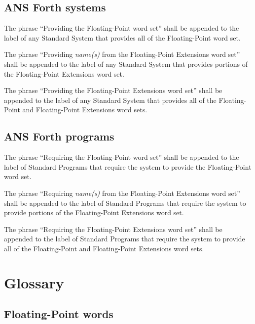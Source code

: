 \subsection{ANS Forth systems} %

The phrase ``Providing the Floating-Point word set'' shall be
appended to the label of any Standard System that provides all of
the Floating-Point word set.

The phrase ``Providing \emph{name(s)} from the Floating-Point
Extensions word set'' shall be appended to the label of any Standard
System that provides portions of the Floating-Point Extensions word
set.

The phrase ``Providing the Floating-Point Extensions word set'' shall
be appended to the label of any Standard System that provides all of
the Floating-Point and Floating-Point Extensions word sets.

\subsection{ANS Forth programs} %

The phrase ``Requiring the Floating-Point word set'' shall be
appended to the label of Standard Programs that require the system
to provide the Floating-Point word set.

The phrase ``Requiring \emph{name(s)} from the Floating-Point
Extensions word set'' shall be appended to the label of Standard
Programs that require the system to provide portions of the
Floating-Point Extensions word set.

The phrase ``Requiring the Floating-Point Extensions word set'' shall
be appended to the label of Standard Programs that require the system
to provide all of the Floating-Point and Floating-Point Extensions
word sets.


\section{Glossary} %

\subsection{Floating-Point words} %


